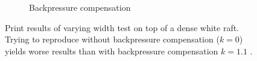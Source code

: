 \begin{figure}
\begin{subfigure}[t]{\figwidth}
\caption{Backpressure compensation}\label{backpressure}
\end{subfigure}
\caption{
Print results of varying width test on top of a dense white raft.
Trying to reproduce  without backpressure compensation ($k=0$) yields worse results  than with backpressure compensation $k=1.1$ .
}
\label{backpressure_compensation}
\end{figure}

